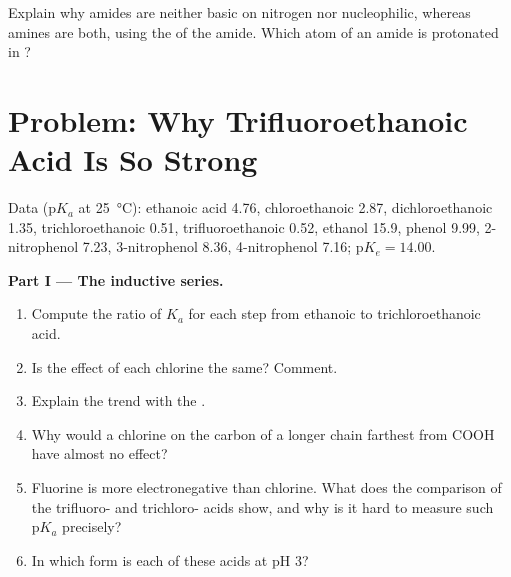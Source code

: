 \begin{exercise}[$\star\star\star$]\label{exo:b1:electronic-effects:12}
Explain why amides are neither basic on nitrogen nor nucleophilic,
whereas amines are both, using the  of the amide.
Which atom of an amide is protonated in ?
\end{exercise}

\section{Problem: Why Trifluoroethanoic Acid Is So Strong}

\begin{problem}
\label{pb:b1:electronic-effects:1}
Data ($\mathrm{p}K_a$ at \qty{25}{\celsius}): ethanoic acid 4.76,
chloroethanoic 2.87, dichloroethanoic 1.35, trichloroethanoic 0.51,
trifluoroethanoic 0.52, ethanol 15.9, phenol 9.99, 2-nitrophenol 7.23,
3-nitrophenol 8.36, 4-nitrophenol 7.16; $\mathrm{p}K_e = 14.00$.

\medskip
\noindent\textbf{Part I --- The inductive series.}
\begin{enumerate}
  \item Compute the ratio of $K_a$ for each step from ethanoic to
        trichloroethanoic acid.
  \item Is the effect of each chlorine the same? Comment.
  \item Explain the trend with the .
  \item Why would a chlorine on the carbon of a longer chain farthest
        from COOH have almost no effect?
  \item Fluorine is more electronegative than chlorine. What does the
        comparison of the trifluoro- and trichloro- acids show, and why
        is it hard to measure such $\mathrm{p}K_a$ precisely?
  \item In which form is each of these acids at pH 3?
\end{enumerate}


\end{problem}
